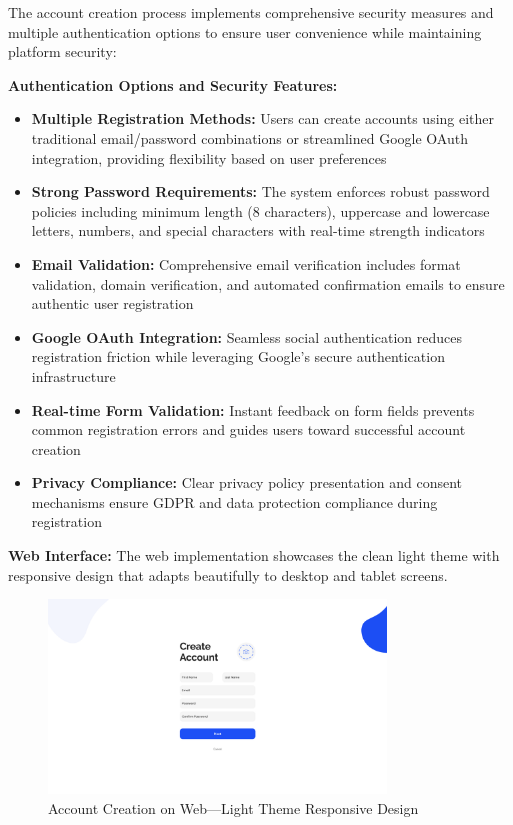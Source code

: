 The account creation process implements comprehensive security measures and multiple authentication options to ensure user convenience while maintaining platform security:

\textbf{Authentication Options and Security Features:}
\begin{itemize}
    \item \textbf{Multiple Registration Methods:} Users can create accounts using either traditional email/password combinations or streamlined Google OAuth integration, providing flexibility based on user preferences
    \item \textbf{Strong Password Requirements:} The system enforces robust password policies including minimum length (8 characters), uppercase and lowercase letters, numbers, and special characters with real-time strength indicators
    \item \textbf{Email Validation:} Comprehensive email verification includes format validation, domain verification, and automated confirmation emails to ensure authentic user registration
    \item \textbf{Google OAuth Integration:} Seamless social authentication reduces registration friction while leveraging Google's secure authentication infrastructure
    \item \textbf{Real-time Form Validation:} Instant feedback on form fields prevents common registration errors and guides users toward successful account creation
    \item \textbf{Privacy Compliance:} Clear privacy policy presentation and consent mechanisms ensure GDPR and data protection compliance during registration
\end{itemize}

\textbf{Web Interface:}
The web implementation showcases the clean light theme with responsive design that adapts beautifully to desktop and tablet screens.

\begin{figure}[!htbp]
    \centering
    \includegraphics[width=0.8\textwidth]{figures/ui/create_account_web.png}
    \caption{Account Creation on Web---Light Theme Responsive Design}\label{fig:web_account_creation}
\end{figure}

